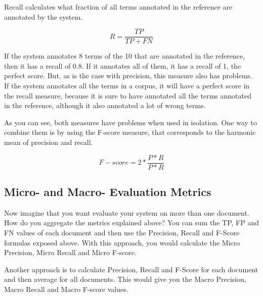 Recall calculates what fraction of all terms annotated in the reference are annotated by the system.

\begin{equation}
R = \frac{TP}{TP+FN}
\end{equation}

If the system annotates 8 terms of the 10 that are annotated in the reference, then it has a recall of 0.8. If it annotates all of them, it has a recall of 1, the perfect score. But, as is the case with precision, this measure also has problems. If the system annotates all the terms in a corpus, it will have a perfect score in the recall measure, because it is sure to have annotated all the terms annotated in the reference, although it also annotated a lot of wrong terms.

As you can see, both measures have problems when used in isolation. One way to combine them is by using the F-score measure, that corresponds to the harmonic mean of precision and recall.

\begin{equation}
F−score = 2 * \frac{P*R}{P*R}
\end{equation}

\subsection{Micro- and Macro- Evaluation Metrics}

Now imagine that you want evaluate your system on more than one document. How do you aggregate the metrics explained above? You can sum the TP, FP and FN values of each document and then use the Precision, Recall and F-Score formulas exposed above. With this approach, you would calculate the Micro Precision, Micro Recall and Micro F-score.

Another approach is to calculate Precision, Recall and F-Score for each document and then average for all documents. This would give you the Macro Precision, Macro Recall and Macro F-score values.


